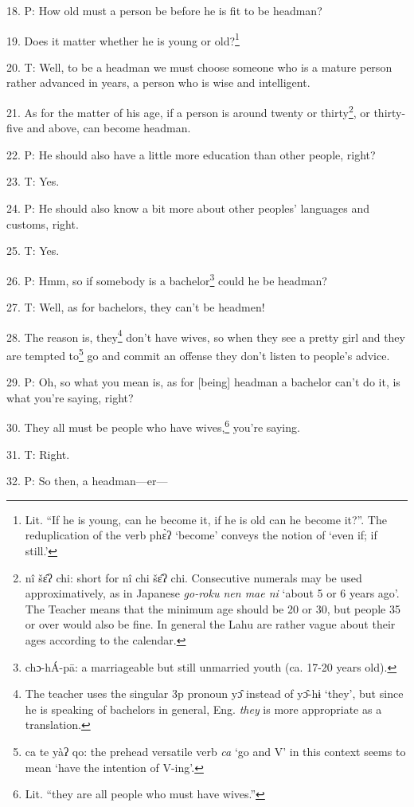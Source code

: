 18. P: How old must a person be before he is fit to be headman?

19. Does it matter whether he is young or old?\footnote{Lit. ``If he is young, can he become it, if he is old can he become it?''. The reduplication of the verb phɛ̀ʔ `become' conveys the notion of `even if; if still.'}

20. T: Well, to be a headman we must choose someone who is a mature person rather
advanced in years, a person who is wise and intelligent.

21. As for the matter of his age, if a person is around twenty or thirty\footnote{nî šɛ̂ʔ chi: short for nî chi šɛ̂ʔ chi. Consecutive numerals may be used approximatively, as in Japanese \textit{go-roku nen mae ni} `about 5 or 6 years ago'. The Teacher means that the minimum age should be 20 or 30, but people 35 or over would also be fine. In general the Lahu are rather vague about their ages according to the calendar.}, or
thirty-five and above, can become headman.

22. P: He should also have a little more education than other people, right?

23. T: Yes.

24. P: He should also know a bit more about other peoples' languages and customs,
right.

25. T: Yes.

26. P: Hmm, so if somebody is a bachelor\footnote{chɔ-hÁ-pā: a marriageable but still unmarried youth (ca. 17-20 years old).} could he be headman?

27. T: Well, as for bachelors, they can't be headmen!

28. The reason is, they\footnote{The teacher uses the singular 3p pronoun yɔ̂ instead of yɔ̂-hɨ `they', but since he is speaking of bachelors in general, Eng. \textit{they} is more appropriate as a translation.} don't have wives, so when they see a pretty girl and
they are tempted to\footnote{ca te yàʔ qo: the prehead versatile verb \textit{ca} `go and V' in this context seems to mean `have the intention of V-ing'.} go and commit an offense they don't listen to people's advice.

29. P: Oh, so what you mean is, as for [being] headman a bachelor can't do it,
is what you're saying, right?

30. They all must be people who have wives,\footnote{Lit. ``they are all people who must have wives.''} you're saying.

31. T: Right.

32. P: So then, a headman---er---

